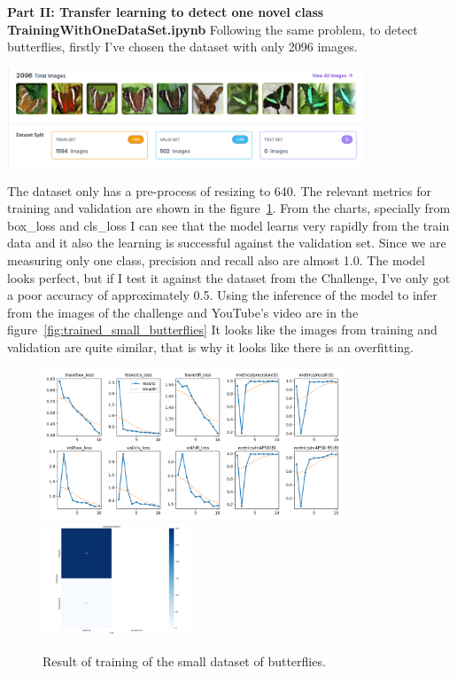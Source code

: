 \documentclass{cpsc202}
\begin{document}
    \newpage
    \large\textbf{Part II: Transfer learning to detect one novel class}
    \Large\textbf{TrainingWithOneDataSet.ipynb}
    Following the same problem, to detect butterflies, firstly I've chosen the dataset with only 2096 images.
    \begin{center}
        \includegraphics[width=0.8\textwidth]{trained_small_butterflies/dataset_simple}
    \end{center}
    The dataset only has a pre-process of resizing to 640.
    The relevant metrics for training and validation are shown in the figure~\ref{fig:results-small}.
    From the charts, specially from box\_loss and cls\_loss I can see that the model learns very rapidly from the train data and it also the learning is successful against the validation set.
    Since we are measuring only one class, precision and recall also are almost 1.0.
    The model looks perfect, but if I test it against the dataset from the Challenge, I've only got a poor accuracy of approximately 0.5.
    Using the inference of the model to infer from the images of the challenge and YouTube's video are in the figure~\ref{fig:trained_small_butterflies}
    It looks like the images from training and validation are quite similar, that is why it looks like there is an overfitting.
    \begin{figure}
        \begin{center}
            \includegraphics[width=0.8\textwidth]{trained_small_butterflies/results}
            \includegraphics[width=0.4\textwidth]{trained_small_butterflies/confusion_matrix_simple}
        \end{center}
        \caption{Result of training of the small dataset of butterflies.}
        \label{fig:results-small}
    \end{figure}
\end{document}
